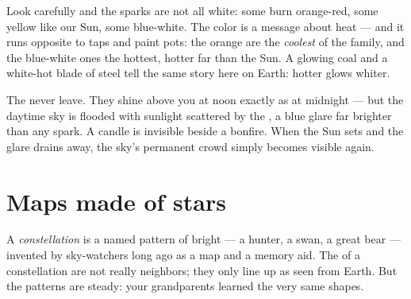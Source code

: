 \begin{example}\label{ex:g5:stars-night-sky:colors}
Look carefully and the sparks are not all white: some burn
orange-red, some yellow like our Sun, some blue-white. The color is
a message about heat --- and it runs opposite to taps and paint
pots: the orange  are the \emph{coolest} of the family, and
the blue-white ones the hottest, hotter far than the Sun. A
glowing coal and a white-hot blade of steel tell the same story
here on Earth: hotter glows whiter.
\end{example}

\begin{remark}\label{rem:g5:stars-night-sky:daytime}
The  never leave. They shine above you at noon exactly as at
midnight --- but the daytime sky is flooded with sunlight scattered
by the , a blue glare far brighter than any spark. A candle is
invisible beside a bonfire. When the Sun sets and the glare drains
away, the sky's permanent crowd simply becomes visible again.
\end{remark}

\section{Maps made of stars}

\begin{definition}[Constellation]\label{def:g5:stars-night-sky:constellation}
A \emph{constellation} is a named pattern of
bright  --- a hunter, a swan, a great bear --- invented by
sky-watchers long ago as a map and a memory aid. The  of a
constellation are not really neighbors; they only line up as seen
from Earth. But the patterns are steady: your grandparents learned
the very same shapes.
\end{definition}

